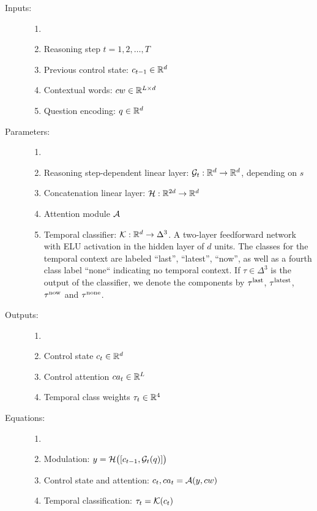 \begin{description}
	\item[Inputs:] 
	\begin{enumerate}
		\item[]
		\item Reasoning step $t = 1,2, \dots, T$
		\item Previous control state: $c_{t-1} \in \mathbb{R}^d$	
		\item Contextual words: $cw \in \mathbb{R}^{L \times d}$
		\item Question encoding: $q \in \mathbb{R}^d$
	\end{enumerate}
	
	\item[Parameters:] 
	\begin{enumerate}
		\item[]
		\item Reasoning step-dependent linear layer: $\mathcal{G}_t: \mathbb{R}^d \to \mathbb{R}^d$, depending on $s$
		\item Concatenation linear layer: $\mathcal{H}: \mathbb{R}^{2d} \to \mathbb{R}^d$
		\item Attention module $\mathcal{A}$
		\item Temporal classifier:  $\mathcal{K}: \mathbb{R}^d \to \Delta^3$. A two-layer feedforward
		network with ELU activation in the hidden layer of $d$ units.	
		The classes for the temporal context are labeled ``last'', ``latest'', ``now'', as well as 
		a fourth class label ``none`` indicating no temporal context.
		If $\tau \in \Delta^3$ is the output of the classifier, we denote the components by
		$\tau^{\mathrm{last}}$, $\tau^{\mathrm{latest}}$, $\tau^{\mathrm{now}}$ and $\tau^{\mathrm{none}}$.
	\end{enumerate}
	
	\item[Outputs:] 
	\begin{enumerate}
		\item[]
		\item Control state $c_t \in \mathbb{R}^d$
		\item Control attention $ca_t \in \mathbb{R}^L$
		\item Temporal class weights $\tau_t \in \mathbb{R}^4$
    \end{enumerate}
	
	\item[Equations:] 
	\begin{enumerate}
		\item[]
		\item Modulation: $y = \mathcal{H}\bigl([c_{t-1}, \mathcal{G}_t(q)]\bigr)$
		\item Control state and attention: $c_t,  ca_t= \mathcal{A}(y, cw)$
		\item Temporal classification: $\tau_t = \mathcal{K}(c_t)$
\end{enumerate}
\end{description}


